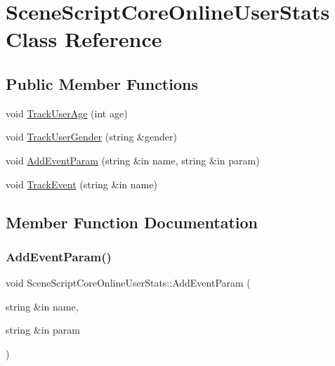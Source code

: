 \hypertarget{class_scene_script_core_online_user_stats}{}\section{Scene\+Script\+Core\+Online\+User\+Stats Class Reference}
\label{class_scene_script_core_online_user_stats}
\subsection*{Public Member Functions}
\begin{DoxyCompactItemize}
\item 
void \hyperlink{class_scene_script_core_online_user_stats_a7f55a546a10f42100f39fb26ae665747}{Track\+User\+Age} (int age)
\item 
void \hyperlink{class_scene_script_core_online_user_stats_ab4de92b0e8e5cd67d24eb0806467df21}{Track\+User\+Gender} (string \&gender)
\item 
void \hyperlink{class_scene_script_core_online_user_stats_acbc627969ac873d69ad5dbf10d21a63c}{Add\+Event\+Param} (string \&in name, string \&in param)
\item 
void \hyperlink{class_scene_script_core_online_user_stats_a9bfaf9b00c4e45f671fedc2d1eb1e03e}{Track\+Event} (string \&in name)
\end{DoxyCompactItemize}


\subsection{Member Function Documentation}
\hypertarget{class_scene_script_core_online_user_stats_acbc627969ac873d69ad5dbf10d21a63c}{}\label{class_scene_script_core_online_user_stats_acbc627969ac873d69ad5dbf10d21a63c} 
\subsubsection{\texorpdfstring{Add\+Event\+Param()}{AddEventParam()}}
{\footnotesize\ttfamily void Scene\+Script\+Core\+Online\+User\+Stats\+::\+Add\+Event\+Param (\begin{DoxyParamCaption}\item[{string \&in}]{name,  }\item[{string \&in}]{param }\end{DoxyParamCaption})}


